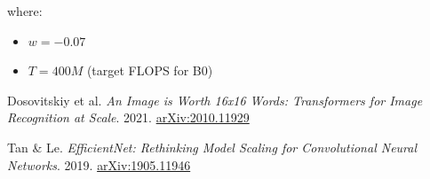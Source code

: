 \documentclass[12pt]{article}
\begin{document}
\begin{appendices}
where:
\begin{itemize}
    \item $w = -0.07$
    \item $T = 400M$ (target FLOPS for B0)
\end{itemize}

\begin{thebibliography}{9}
Dosovitskiy et al. 
\textit{An Image is Worth 16x16 Words: Transformers for Image Recognition at Scale}. 
2021. 
\href{https://arxiv.org/abs/2010.11929}{arXiv:2010.11929}

Tan \& Le. 
\textit{EfficientNet: Rethinking Model Scaling for Convolutional Neural Networks}. 
2019. 
\href{https://arxiv.org/abs/1905.11946}{arXiv:1905.11946}
\end{thebibliography}

\end{appendices}
\end{document}
